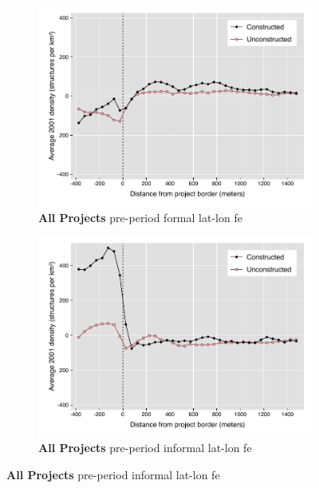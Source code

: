 \documentclass[12pt]{article}
\begin{document}
\begin{figure}
        \centering
        \begin{subfigure}[b]{0.48\textwidth}
                    \caption[Network2]%
            {{\footnotesize \textbf{All Projects} pre-period formal lat-lon fe}}    
            \label{fig:prefor}
            \centering
            \includegraphics[width=\textwidth,trim={0.3cm .3cm 0.1cm 0cm}, clip=true]{figures/bblu_for_fe_pre_means_4_30k.pdf}

        \end{subfigure}
        \hfill
        \begin{subfigure}[b]{0.48\textwidth}  
                    \caption[]%
            {{\footnotesize \textbf{All Projects} pre-period informal lat-lon fe }}      
            \label{fig:preinf}
            \centering 
            \includegraphics[width=\textwidth,trim={0.3cm .3cm 0.1cm 0cm}, clip=true]{figures/bblu_inf_fe_pre_means_4_30k.pdf}


\end{subfigure}
\end{figure}
\end{document}

